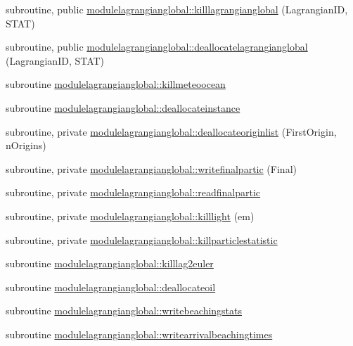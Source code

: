 \begin{DoxyCompactItemize}
\item 
subroutine, public \mbox{\hyperlink{namespacemodulelagrangianglobal_a0c95242d79d3bded29c18e1055a5a11d}{modulelagrangianglobal\+::killlagrangianglobal}} (Lagrangian\+ID, S\+T\+AT)
\item 
subroutine, public \mbox{\hyperlink{namespacemodulelagrangianglobal_ad5b47824d7c52644996eed764c9ee9ae}{modulelagrangianglobal\+::deallocatelagrangianglobal}} (Lagrangian\+ID, S\+T\+AT)
\item 
subroutine \mbox{\hyperlink{namespacemodulelagrangianglobal_a554a65c3f7ed6c27bff5e766338687d5}{modulelagrangianglobal\+::killmeteoocean}}
\item 
subroutine \mbox{\hyperlink{namespacemodulelagrangianglobal_a8fa9aff34dfeede08953dd200b17e64b}{modulelagrangianglobal\+::deallocateinstance}}
\item 
subroutine, private \mbox{\hyperlink{namespacemodulelagrangianglobal_a6e34918fa64284d7048a43df89293088}{modulelagrangianglobal\+::deallocateoriginlist}} (First\+Origin, n\+Origins)
\item 
subroutine, private \mbox{\hyperlink{namespacemodulelagrangianglobal_a2bf7986f317831603f4eb96d616f643e}{modulelagrangianglobal\+::writefinalpartic}} (Final)
\item 
subroutine, private \mbox{\hyperlink{namespacemodulelagrangianglobal_a101ffba4c1f5b064fc15cf4cd92df60e}{modulelagrangianglobal\+::readfinalpartic}}
\item 
subroutine, private \mbox{\hyperlink{namespacemodulelagrangianglobal_ae738cd408e31ba7ac9158f7d3e11b53a}{modulelagrangianglobal\+::killlight}} (em)
\item 
subroutine, private \mbox{\hyperlink{namespacemodulelagrangianglobal_a3ce834e6c05495002ac0eda8b4096d0e}{modulelagrangianglobal\+::killparticlestatistic}}
\item 
subroutine \mbox{\hyperlink{namespacemodulelagrangianglobal_aebe9f7760ed357205d3844024707e233}{modulelagrangianglobal\+::killlag2euler}}
\item 
subroutine \mbox{\hyperlink{namespacemodulelagrangianglobal_a09f60316f814ba83ce713d83c0cf67ef}{modulelagrangianglobal\+::deallocateoil}}
\item 
subroutine \mbox{\hyperlink{namespacemodulelagrangianglobal_ab5538aa3df9f78e442a96f940f3d160f}{modulelagrangianglobal\+::writebeachingstats}}
\item 
subroutine \mbox{\hyperlink{namespacemodulelagrangianglobal_abe2b20a8a7925f8d626cdc676a372c07}{modulelagrangianglobal\+::writearrivalbeachingtimes}}

\end{DoxyCompactItemize}
